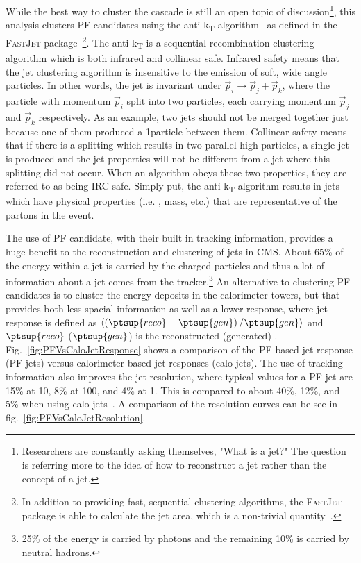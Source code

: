 While the best way to cluster the cascade is still an open topic of discussion\footnote{Researchers are constantly asking themselves, "What is a jet?" The question is referring more to the idea of how to reconstruct a jet rather than the concept of a jet.}, this analysis clusters PF candidates using the anti-k\textsubscript{T} algorithm~\cite{Cacciari:2008gp} as defined in the \textsc{Fast}\textsc{Jet} package~\cite{Cacciari:2011ma}\footnote{In addition to providing fast, sequential clustering algorithms, the \textsc{Fast}\textsc{Jet} package is able to calculate the jet area, which is a non-trivial quantity~\cite{Cacciari2008}.}.
The anti-k\textsubscript{T} is a sequential recombination clustering algorithm which is both infrared and collinear safe.
Infrared safety means that the jet clustering algorithm is insensitive to the emission of soft, wide angle particles.
In other words, the jet is invariant under $\vec{p}_{i}\rightarrow\vec{p}_{j}+\vec{p}_{k}$, where the particle with momentum $\vec{p}_{i}$ split into two particles, each carrying momentum $\vec{p}_{j}$ and $\vec{p}_{k}$ respectively.
As an example, two jets should not be merged together just because one of them produced a 1\gev particle between them.
Collinear safety means that if there is a splitting which results in two parallel high-\pt particles, a single jet is produced and the jet properties will not be different from a jet where this splitting did not occur.
When an algorithm obeys these two properties, they are referred to as being IRC safe.
Simply put, the anti-k\textsubscript{T} algorithm results in jets which have physical properties (i.e. \pt, mass, etc.) that are representative of the partons in the event.

The use of PF candidate, with their built in tracking information, provides a huge benefit to the reconstruction and clustering of jets in CMS. About 65\% of the energy within a jet is carried by the charged particles and thus a lot of information about a jet comes from the tracker.\footnote{25\% of the energy is carried by photons and the remaining 10\% is carried by neutral hadrons.} An alternative to clustering PF candidates is to cluster the energy deposits in the calorimeter towers, but that provides both less spacial information as well as a lower response, where jet response is defined as $\left<\left(\ptsup{reco}-\ptsup{gen}\right)/\ptsup{gen}\right>$ and $\ptsup{reco}$ ($\ptsup{gen}$) is the reconstructed (generated) \pt. Fig.~\ref{fig:PFVsCaloJetResponse} shows a comparison of the PF based jet response (PF jets) versus calorimeter based jet responses (calo jets). The use of tracking information also improves the jet resolution, where typical values for a PF jet are 15\% at 10\GeV, 8\% at 100\GeV, and 4\% at 1\TeV. This is compared to about 40\%, 12\%, and 5\% when using calo jets~\cite{CMS-PAS-PFT-09-001}. A comparison of the resolution curves can be see in fig.~\ref{fig:PFVsCaloJetResolution}.

